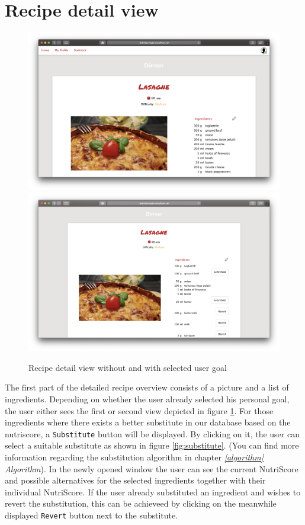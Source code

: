 \section*{Recipe detail view}
\vspace{-1em}
\begin{figure}[H]
	\captionsetup{justification=centering}
	\centering
		\includegraphics[scale=0.25]{Ressourcen/img/screenshots/screenshotH.png}
		\includegraphics[scale=0.25]{Ressourcen/img/screenshots/screenshotI.png}
		\vspace{-1em}
		\caption{Recipe detail view without and with selected user goal}
		\label{fig:recipeDetail}
\end{figure}
\vspace{-2em}
The first part of the detailed recipe overview consists of a picture and a list of ingredients. Depending on whether the user already selected his personal goal, the user either sees the first or second view depicted in figure \ref{fig:recipeDetail}. For those ingredients where there exists a better substitute in our database based on the nutriscore, a \texttt{Substitute} button will be displayed. By clicking on it, the user can select a suitable substitute as shown in figure \ref{fig:substitute}. (You can find more information regarding the substitution algorithm in chapter \emph{\ref{algorithm}  Algorithm}). In the newly opened window the user can see the current NutriScore and possible alternatives for the selected ingredients together with their individual NutriScore. If the user already substituted an ingredient and wishes to revert the substitution, this can be achieveed by clicking on the meanwhile displayed \texttt{Revert} button next to the substitute. 
